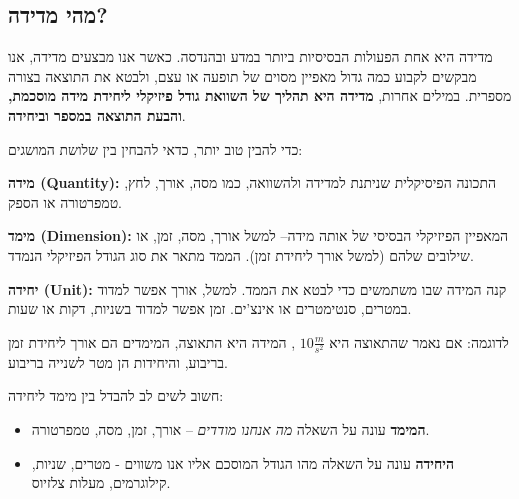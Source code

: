 \documentclass[
  hebrew,
  letterpaper,
  DIV=11,
  numbers=noendperiod]{scrreprt}
\providecommand{\tightlist}{%
  \setlength{\itemsep}{0pt}\setlength{\parskip}{0pt}}
\begin{document}
\subsection{\texorpdfstring{{מהי
מדידה}?}{מהי מדידה?}}\label{ux5deux5d4ux5d9-ux5deux5d3ux5d9ux5d3ux5d4}

{מדידה היא אחת הפעולות הבסיסיות ביותר במדע ובהנדסה. כאשר אנו מבצעים
מדידה, אנו מבקשים לקבוע כמה גדול מאפיין מסוים של תופעה או עצם, ולבטא את
התוצאה בצורה מספרית. במילים אחרות}, \textbf{{מדידה היא תהליך של השוואת
גודל פיזיקלי ליחידת מידה מוסכמת, והבעת התוצאה במספר וביחידה}}.

{כדי להבין טוב יותר, כדאי להבחין בין שלושת המושגים}:

\textbf{{מידה} (Quantity):} {התכונה הפיסיקלית שניתנת למדידה ולהשוואה,
כמו מסה, אורך, לחץ, טמפרטורה או הספק.}

\textbf{{מימד} (Dimension):} {המאפיין הפיזיקלי הבסיסי של אותה מידה--
למשל אורך, מסה, זמן,} {או שילובים שלהם (למשל אורך ליחידת זמן). הממד מתאר
את סוג הגודל הפיזיקלי הנמדד.}

\textbf{{יחידה} (Unit):} {קנה המידה שבו משתמשים כדי לבטא את הממד. למשל,
אורך אפשר למדוד במטרים, סנטימטרים או אינצ'ים. זמן אפשר למדוד בשניות,
דקות או שעות}.

{לדוגמה: אם נאמר שהתאוצה היא} \(10\frac{m}{s^{2}}\) {, המידה היא התאוצה,
המימדים הם אורך ליחידת זמן בריבוע, והיחידות הן מטר לשנייה בריבוע.}

{חשוב לשים לב להבדל בין מימד ליחידה}:

\begin{tcolorbox}[enhanced jigsaw, colback=white, arc=.35mm, coltitle=black, breakable, toptitle=1mm, leftrule=.75mm, colbacktitle=quarto-callout-note-color!10!white, opacitybacktitle=0.6, bottomtitle=1mm, titlerule=0mm, opacityback=0, colframe=quarto-callout-note-color-frame, title=\textcolor{quarto-callout-note-color}{\faInfo}\hspace{0.5em}{הערה}, rightrule=.15mm, bottomrule=.15mm, toprule=.15mm, left=2mm]

\begin{itemize}
\tightlist
\item
  {\textbf{המימד} עונה על השאלה \emph{מה אנחנו מודדים}} -- {אורך, זמן,
  מסה, טמפרטורה}.
\item
  {\textbf{היחידה} עונה על השאלה מהו הגודל המוסכם אליו אנו משווים -}
  {מטרים, שניות, קילוגרמים, מעלות צלזיוס}.
\end{itemize}

\end{tcolorbox}
\end{document}
